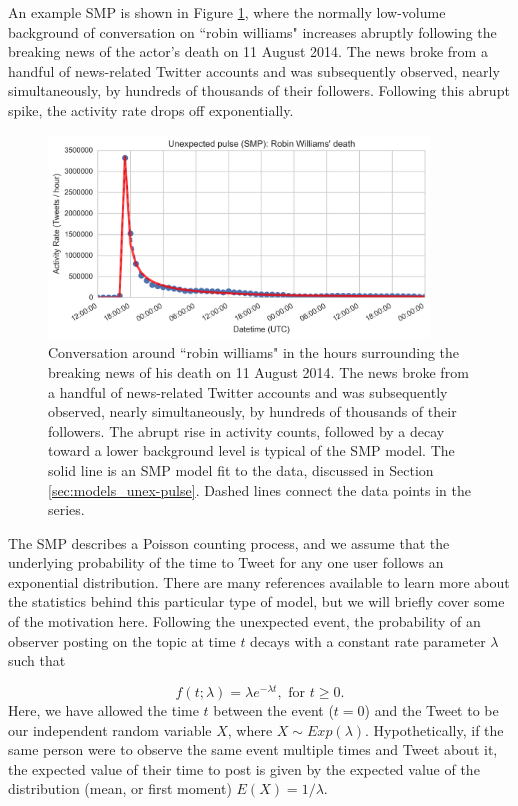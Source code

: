 \documentclass{article}
\begin{document}
An example SMP is shown in Figure \ref{fig:williams}, where the normally low-volume background of conversation on ``robin williams" increases abruptly following the breaking news of the actor's death on 11 August 2014. The news broke from a handful of news-related Twitter accounts and was subsequently observed, nearly simultaneously, by hundreds of thousands of their followers. Following this abrupt spike, the activity rate drops off exponentially.  


\begin{figure}[!b]
\centering
\includegraphics[width=0.9\textwidth]{img/williams.png}
\caption{Conversation around ``robin williams" in the hours surrounding the breaking news of his death on 11 August 2014. The news broke from a handful of news-related Twitter accounts and was subsequently observed, nearly simultaneously, by hundreds of thousands of their followers. The abrupt rise in activity counts, followed by a decay toward a lower background level is typical of the SMP model. The solid line is an SMP model fit to the data, discussed in Section \ref{sec:models_unex-pulse}. Dashed lines connect the data points in the series.}
\label{fig:williams}
\end{figure}


The SMP describes a Poisson counting process, and we assume that the underlying probability of the time to Tweet for any one user follows an exponential distribution. There are many references available to learn more about the statistics behind this particular type of model,\cite{wiki:poisson} but we will briefly cover some of the motivation here. Following the unexpected event, the probability of an observer posting on the topic at time $t$ decays with a constant rate parameter $\lambda$ such that

\begin{equation}
f(t;\lambda) = \lambda e^{-\lambda t}, \text{ for } t \geq 0.
\label{eq:exponential}
\end{equation}
Here, we have allowed the time $t$ between the event ($t=0$) and the Tweet to be our independent random variable $X$, where $X \sim Exp(\lambda)$. Hypothetically, if the same person were to observe the same event multiple times and Tweet about it, the expected value of their time to post is given by the expected value of the distribution (mean, or first moment) $E(X)=1/\lambda$.
\end{document}
